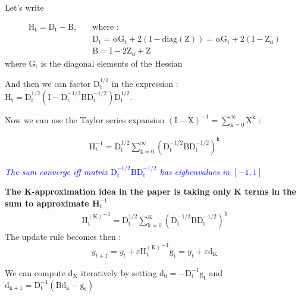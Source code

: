 \documentclass[10pt,english]{article}
\begin{document}
Let's write

\begin{align*}
    \mathrm{H_t = D_t - B}, \quad  &\text{where : } \\
    &\mathrm{D_t = \alpha G_t + 2(I - diag(Z)) = \alpha G_t + 2(I - Z_d)} \\
    &\mathrm{B = I - 2Z_d + Z}
\end{align*}
where $\mathrm{G_t}$ is the diagonal elements of the Hessian

And then we can factor $\mathrm{D_t^{1/2}}$ in the expression :  $\mathrm{H_t = D_t^{1/2}(I - D_t^{-1/2}BD_t^{-1/2})D_t^{1/2}}$. 

Now we can use the Taylor series expansion $\mathrm{{(I-X)^{-1}} = \sum_{k=0}^\infty X^k}$ : 

\begin{align*}
    \mathrm{H_t^{-1} = D_t^{1/2} \sum_{k=0}^\infty (D_t^{-1/2}BD_t^{-1/2})^k}
\end{align*}

\textcolor{blue}{\small\textit{ The sum converge iff matrix $\mathrm{D_t^{-1/2}BD_t^{-1/2}}$ has eighenvalues in $[-1,1]$}}

\textbf{The K-approximation idea in the paper is taking only K terms in the sum to approximate $\mathrm{\textbf{H}_t^{-1}}$}
\begin{align*}
    \mathrm{{H_t^{(K)}}^{-1} = D_t^{1/2} \sum_{k=0}^K (D_t^{-1/2}BD_t^{-1/2})^k}
\end{align*}
The update rule becomes then : 
$$
y_{t+1} = y_{t} + \varepsilon \mathrm{{H_t^{(K)}}^{-1} g_t}  =  y_{t} + \varepsilon \mathrm{d_K}
$$

We can compute $\mathrm{d}_K$ iteratively by setting $\mathrm{d_0 = -D_t^{-1}  g_t }$ and $\mathrm{d_{k+1}} = \mathrm{D_t^{-1}(Bd_k - g_t)} $
\end{document}
